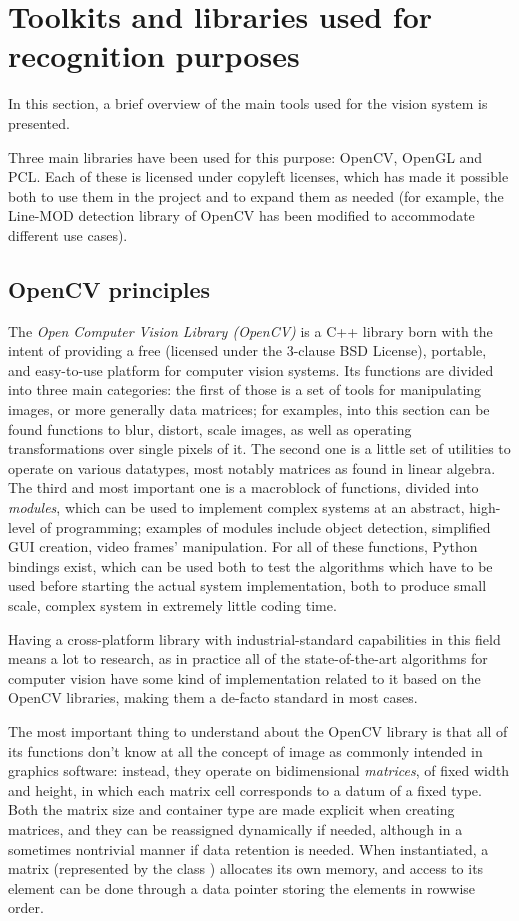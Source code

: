 \section{Toolkits and libraries used for recognition purposes}
In this section, a brief overview of the main tools used for the
vision system is presented.

Three main libraries have been used for this purpose: OpenCV, OpenGL
and PCL. Each of these is licensed under copyleft licenses, which has made
it possible both to use them in the project and to expand them as
needed (for example, the Line-MOD detection library of OpenCV has been
modified to accommodate different use cases).

\subsection{OpenCV principles}
The \emph{Open Computer Vision Library (\emph{OpenCV})} is a C++
library born with the intent of providing a free (licensed under the
3-clause BSD License), portable, and easy-to-use platform for computer
vision systems. Its functions are divided into three main categories:
the first of those is a set of tools for manipulating images, or more
generally data matrices; for examples, into this section can be found
functions to blur, distort, scale images, as well as operating
transformations over single pixels of it. The second one is a little set of utilities
to operate on various datatypes, most notably matrices as found in
linear algebra. The third and most important one is a macroblock of
functions, divided into \emph{modules}, which can be used to implement
complex systems at an abstract, high-level of programming; examples of
modules include object detection, simplified GUI creation, video
frames' manipulation. For all of these functions, Python bindings
exist, which can be used both to test the algorithms which have to be used
before starting the actual system implementation, both to produce
small scale, complex system in extremely little coding time.

Having a cross-platform library with industrial-standard capabilities
in this field means a lot to research, as in practice all of the
state-of-the-art algorithms for computer vision have some kind of
implementation related to it based on the OpenCV libraries, making
them a de-facto standard in most cases.

The most important thing to understand about the OpenCV library is
that all of its functions don't know at all the concept of image as
commonly intended in graphics software: instead, they operate on
bidimensional \emph{matrices}, of fixed width and height, in
which each matrix cell corresponds to a datum of a fixed type. Both
the matrix size and container type are made explicit when creating
matrices, and they can be reassigned dynamically if needed, although
in a sometimes nontrivial manner if data retention is needed. When
instantiated, a matrix (represented by the class )
allocates its own memory, and access to its element can be done
through a data pointer storing the elements in rowwise order.

